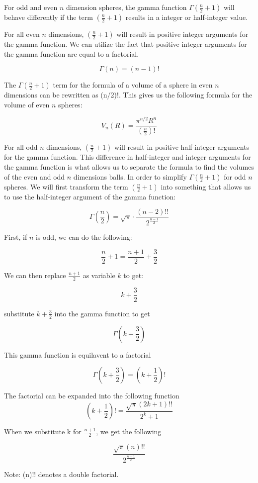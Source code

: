 \documentclass{article}
\begin{document}
For odd and even $n$ dimension spheres, the gamma function $\Gamma(\frac{n}{2}+1)$ will behave differently if the term $(\frac{n}{2}+1)$ results in a integer or half-integer value.

For all even $n$ dimensions, $(\frac{n}{2}+1)$ will result in positive integer arguments for the gamma function. We can utilize the fact that positive integer arguments for the gamma function are equal to a factorial.

\[\Gamma(n) = (n-1)!
\]

The $\Gamma(\frac{n}{2}+1)$ term for the formula of a volume of a sphere in even $n$ dimensions can be rewritten as (n/2)!. This gives us the following formula for the volume of even $n$ spheres:

\[V_n(R)=\frac{\pi^{n/2}R^n}{(\frac{n}{2})!}
\]

For all odd $n$ dimensions, $(\frac{n}{2}+1)$ will result in positive half-integer arguments for the gamma function. This difference in half-integer and integer arguments for the gamma function is what allows us to separate the formula to find the volumes of the even and odd $n$ dimensions balls. In order to simplify $\Gamma(\frac{n}{2}+1)$ for odd $n$ spheres. We will first transform the term $(\frac{n}{2}+1)$ into something that allows us to use the half-integer argument of the gamma function:

\[\Gamma(\frac{n}{2}) = \sqrt{\pi} \cdot \frac{(n-2)!!}{2^{\frac{n-1}{2}}}
\]

First, if $n$ is odd, we can do the following:

\[ \frac{n}{2}+1=\frac{n+1}{2}+\frac{3}{2}
\]

We can then replace $\frac{n+1}{2}$ as variable $k$ to get:

\[ k+\frac{3}{2}
\]

substitute $k+\frac{3}{2}$ into the gamma function to get 

\[ \Gamma(k+\frac{3}{2})
\]

This gamma function is equilavent to a factorial

\[ \Gamma(k+\frac{3}{2}) = (k+\frac{1}{2})!
\]

The factorial can be expanded into the following function
\[ (k+\frac{1}{2})! = \frac{\sqrt{\pi}(2k+1)!!}{2^k+1}
\]

When we substitute k for $\frac{n+1}{2}$, we get the following

\[ \frac{\sqrt{\pi}(n)!!}{2^\frac{n+1}{2}}
\]

Note: (n)!! denotes a double factorial. 
\end{document}
